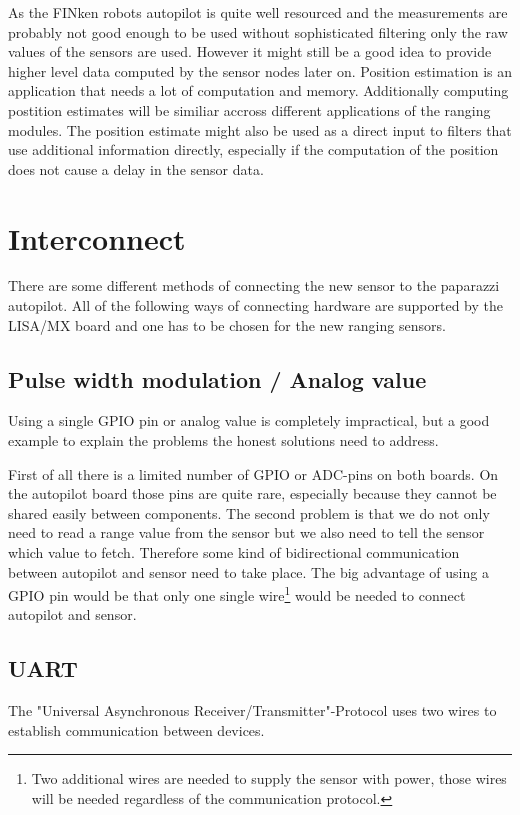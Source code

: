 As the FINken robots autopilot is quite well resourced and the measurements are probably not good enough to be used without sophisticated filtering only the raw values of the sensors are used.
However it might still be a good idea to provide higher level data computed by the sensor nodes later on.
Position estimation is an application that needs a lot of computation and memory.
Additionally computing postition estimates will be similiar accross different applications of the ranging modules.
The position estimate might also be used as a direct input to filters that use additional information directly, especially if the computation of the position does not cause a delay in the sensor data.


\section{Interconnect}
There are some different methods of connecting the new sensor to the paparazzi autopilot.
All of the following ways of connecting hardware are supported by the LISA/MX board and one has to be chosen for the new ranging sensors.

\subsection{Pulse width modulation / Analog value}
Using a single GPIO pin or analog value is completely impractical, but a good example to explain the problems the honest solutions need to address.

First of all there is a limited number of GPIO or ADC-pins on both boards.
On the autopilot board those pins are quite rare, especially because they cannot be shared easily between components.
The second problem is that we do not only need to read a range value from the sensor but we also need to tell the sensor which value to fetch.
Therefore some kind of bidirectional communication between autopilot and sensor need to take place.
The big advantage of using a GPIO pin would be that only one single wire\footnote{Two additional wires are needed to supply the sensor with power, those wires will be needed regardless of the communication protocol.} would be needed to connect autopilot and sensor.

\subsection{UART}
The "Universal Asynchronous Receiver/Transmitter"-Protocol uses two wires to establish communication between devices.
\cite{wingen_automatic_2004}

